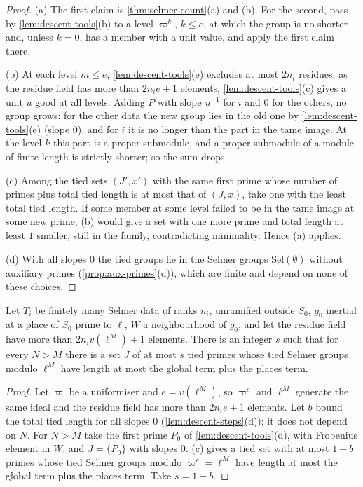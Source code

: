 \begin{proof}
(a) The first claim is \cref{thm:selmer-count}(a) and (b). For the second, pass by \cref{lem:descent-tools}(b) to a level $\varpi^k$, $k\le e$, at which the group is no shorter and, unless $k=0$, has a member with a unit value, and apply the first claim there.

(b) At each level $m\le e$, \cref{lem:descent-tools}(e) excludes at most $2n_i$ residues; as the residue field has more than $2n_ie+1$ elements, \cref{lem:descent-tools}(c) gives a unit $u$ good at all levels. Adding $P$ with slope $u^{-1}$ for $i$ and $0$ for the others, no group grows: for the other data the new group lies in the old one by
\cref{lem:descent-tools}(e) (slope $0$), and for $i$ it is no longer than the part in the tame image. At the level $k$ this part is a proper submodule, and a proper submodule of a module of finite length is strictly shorter; so the sum drops.

(c) Among the tied sets $(J',x')$ with the same first prime whose number of primes plus total tied length is at most that of $(J,x)$, take one with the least total tied length. If some member at some level failed to be in the tame image at some new prime, (b) would give a set with one more prime and total length at least $1$
smaller, still in the family, contradicting minimality. Hence (a) applies.

(d) With all slopes $0$ the tied groups lie in the Selmer groups $\mathrm{Sel}(\emptyset)$ without auxiliary primes (\cref{prop:aux-primes}(d)), which are finite and depend on none of these choices.
\end{proof}

\begin{theorem}[Descent]\label{thm:descent}
Let $T_i$ be finitely many Selmer data of ranks $n_i$, unramified outside $S_0$, $g_0$ inertial at a place of $S_0$ prime to $\ell$, $W$ a neighbourhood of $g_0$, and let the residue field have more than $2n_iv(\ell^M)+1$
elements. There is an integer $s$ such that for every $N>M$ there is a set $J$ of at most $s$ tied primes whose tied Selmer groups modulo $\ell^M$ have length at most the global term plus the places term.
\end{theorem}

\begin{proof}
Let $\varpi$ be a uniformiser and $e=v(\ell^M)$, so $\varpi^e$ and $\ell^M$ generate the same ideal and the residue field has more than $2n_ie+1$ elements. Let $b$ bound the total tied length for all slopes $0$ (\cref{lem:descent-steps}(d)); it does not depend on $N$. For $N>M$ take the first prime $P_0$ of \cref{lem:descent-tools}(d), with
Frobenius element in $W$, and $J=\{P_0\}$ with slopes $0$. (c) gives a tied set with at most $1+b$ primes whose tied Selmer groups modulo $\varpi^e=\ell^M$ have length at most the global term plus the places term. Take $s=1+b$.
\end{proof}


